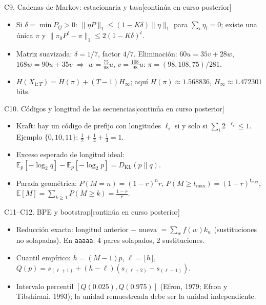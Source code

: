 \documentclass[aspectratio=169,10pt]{beamer}
\newcommand{\posterior}{\hfill{\scriptsize\color{vino}[continúa en curso posterior]}}
\begin{document}
\begin{frame}{C9. Cadenas de Markov: estacionaria y tasa\posterior}
\small
\begin{itemize}
\item Si $\delta=\min P_{ij}>0$: $\|\eta P\|_1\le(1-K\delta)\|\eta\|_1$ para $\sum_i\eta_i=0$; existe una única $\pi$ y $\|\pi_0P^t-\pi\|_1\le2(1-K\delta)^t$.
\item Matriz suavizada: $\delta=1/7$, factor $4/7$. Eliminación: $60u=35v+28w$, $168w=90u+35v$ $\Rightarrow$ $w=\frac{75}{98}u$, $v=\frac{108}{98}u$:
$\pi=(98,108,75)/281$.
\item $H(X_{1:T})=H(\pi)+(T-1)H_\infty$; aquí $H(\pi)\approx1.568836$, $H_\infty\approx1.472301$ bits.
\end{itemize}
\end{frame}

\begin{frame}{C10. Códigos y longitud de las secuencias\posterior}
\small
\begin{itemize}
\item Kraft: hay un código de prefijo con longitudes $\ell_i$ si y solo si $\sum_i2^{-\ell_i}\le1$. Ejemplo $\{0,10,11\}$: $\frac12+\frac14+\frac14=1$.
\item Exceso esperado de longitud ideal: $\mathbb E_p[-\log_2q]-\mathbb E_p[-\log_2p]=D_{\mathrm{KL}}(p\|q)$.
\item Parada geométrica: $P(M=n)=(1-r)^nr$, $P(M\ge t_{\max})=(1-r)^{t_{\max}}$,
$\mathbb E[M]=\sum_{k\ge1}P(M\ge k)=\frac{1-r}{r}$.
\end{itemize}
\end{frame}

\begin{frame}{C11--C12. BPE y bootstrap\posterior}
\small
\begin{itemize}
\item Reducción exacta: longitud anterior $-$ nueva $=\sum_wf(w)k_w$ (sustituciones no solapadas). En \texttt{aaaaa}: 4 pares solapados, 2 sustituciones.
\item Cuantil empírico: $h=(M-1)p$, $\ell=\lfloor h\rfloor$, $Q(p)=s_{(\ell+1)}+(h-\ell)(s_{(\ell+2)}-s_{(\ell+1)})$.
\item Intervalo percentil $[Q(0.025),Q(0.975)]$ (Efron, 1979; Efron y Tibshirani, 1993); la unidad remuestreada debe ser la unidad independiente.
\end{itemize}
\end{frame}
\end{document}
